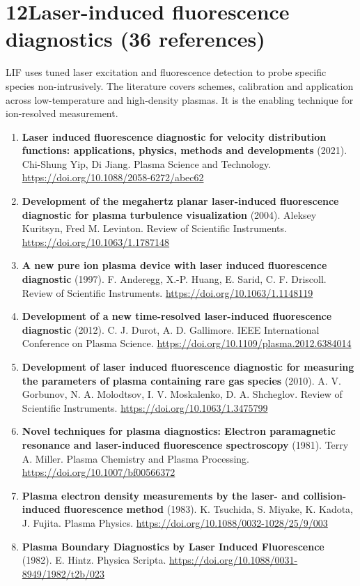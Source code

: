 \documentclass[11pt,a4paper]{article}
\begin{document}
\section*{12\quad Laser-induced fluorescence diagnostics \textnormal{(\normalsize 36 references)}}
LIF uses tuned laser excitation and fluorescence detection to probe specific species non-intrusively. The literature covers schemes, calibration and application across low-temperature and high-density plasmas. It is the enabling technique for ion-resolved measurement.
\begin{enumerate}[leftmargin=1.4em]
\item \textbf{Laser induced fluorescence diagnostic for velocity distribution functions: applications, physics, methods and developments} (2021). Chi-Shung Yip, Di Jiang. Plasma Science and Technology. \url{https://doi.org/10.1088/2058-6272/abec62}
\item \textbf{Development of the megahertz planar laser-induced fluorescence diagnostic for plasma turbulence visualization} (2004). Aleksey Kuritsyn, Fred M. Levinton. Review of Scientific Instruments. \url{https://doi.org/10.1063/1.1787148}
\item \textbf{A new pure ion plasma device with laser induced fluorescence diagnostic} (1997). F. Anderegg, X.-P. Huang, E. Sarid, C. F. Driscoll. Review of Scientific Instruments. \url{https://doi.org/10.1063/1.1148119}
\item \textbf{Development of a new time-resolved laser-induced fluorescence diagnostic} (2012). C. J. Durot, A. D. Gallimore. IEEE International Conference on Plasma Science. \url{https://doi.org/10.1109/plasma.2012.6384014}
\item \textbf{Development of laser induced fluorescence diagnostic for measuring the parameters of plasma containing rare gas species} (2010). A. V. Gorbunov, N. A. Molodtsov, I. V. Moskalenko, D. A. Shcheglov. Review of Scientific Instruments. \url{https://doi.org/10.1063/1.3475799}
\item \textbf{Novel techniques for plasma diagnostics: Electron paramagnetic resonance and laser-induced fluorescence spectroscopy} (1981). Terry A. Miller. Plasma Chemistry and Plasma Processing. \url{https://doi.org/10.1007/bf00566372}
\item \textbf{Plasma electron density measurements by the laser- and collision-induced fluorescence method} (1983). K. Tsuchida, S. Miyake, K. Kadota, J. Fujita. Plasma Physics. \url{https://doi.org/10.1088/0032-1028/25/9/003}
\item \textbf{Plasma Boundary Diagnostics by Laser Induced Fluorescence} (1982). E. Hintz. Physica Scripta. \url{https://doi.org/10.1088/0031-8949/1982/t2b/023}

\end{enumerate}
\end{document}
